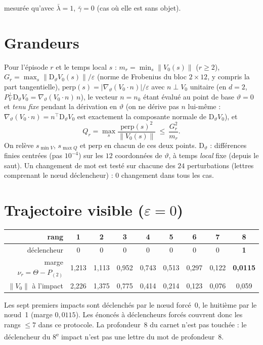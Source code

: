 \documentclass[11pt,a4paper]{article}
\theoremstyle{remark}
\newcommand{\norm}[1]{\lVert #1\rVert}
\newcommand{\vth}{\vartheta}
\newcommand{\D}{\mathrm D}
\begin{document}
mesur\'ee qu'avec $\bar\lambda=1$, $\bar\gamma=0$ (cas o\`u elle est sans objet).

\section{Grandeurs}
Pour l'\'episode $r$ et le temps local $s$ : $m_r=\min_s\norm{V_0(s)}$ ($r\ge2$), $G_r=\max_s\norm{\D_\vth V_0(s)}/\varepsilon$ (norme de Frobenius du bloc $2\times12$, y compris la part tangentielle), $\mathrm{perp}(s)=\lvert\nabla_\vth(V_0\!\cdot n)\rvert/\varepsilon$ avec $n\perp V_0$ unitaire (en $d=2$, $P^\perp_V\D_\vth V_0=\nabla_\vth(V_0\!\cdot n)\,n$), le vecteur $n=n_k$ \'etant \'evalu\'e au point de base $\vth=0$ et \emph{tenu fixe} pendant la d\'erivation en $\vth$ (on ne d\'erive pas $n$ lui-m\^eme : $\nabla_\vth(V_0\!\cdot n)=n^\top\D_\vth V_0$ est exactement la composante normale de $\D_\vth V_0$), et
\[
Q_r=\max_s\frac{\mathrm{perp}(s)^2}{\norm{V_0(s)}}\ \le\ \frac{G_r^2}{m_r}.
\]
On relève $s_{\min V}$, $s_{\max Q}$ et $\mathrm{perp}$ en chacun de ces deux points. $\D_\vth$ : diff\'erences finies centr\'ees (pas $10^{-4}$) sur les $12$ coordonn\'ees de $\vth$, \`a temps \emph{local} fixe (depuis le saut). Un changement de mot est test\'e sur chacune des $24$ perturbations (lettres comprenant le n\oe ud d\'eclencheur) : $0$ changement dans tous les cas.

\section{Trajectoire visible ($\varepsilon=0$)}
\begin{center}\small
\begin{tabular}{r|cccccccc}
\toprule
rang & 1 & 2 & 3 & 4 & 5 & 6 & 7 & 8\\
\midrule
d\'eclencheur & 0&0&0&0&0&0&0&\textbf{1}\\
marge $\nu_r=\Theta-P_{(2)}$ & 1,213 & 1,113 & 0,952 & 0,743 & 0,513 & 0,297 & 0,122 & \textbf{0,0115}\\
$\norm{V_0}$ \`a l'impact & 2,226 & 1,375 & 0,775 & 0,414 & 0,214 & 0,123 & 0,076 & 0,059\\
\bottomrule
\end{tabular}
\end{center}
Les sept premiers impacts sont d\'eclench\'es par le n\oe ud forc\'e~0, le huiti\`eme par le n\oe ud~1 (marge $0{,}0115$). Les \'enonc\'es \`a d\'eclencheurs forc\'es couvrent donc les rangs $\le7$ dans ce protocole. La profondeur~8 du carnet n'est pas touch\'ee : le d\'eclencheur du 8\textsuperscript{e} impact n'est pas une lettre du mot de profondeur~8.
\end{document}
